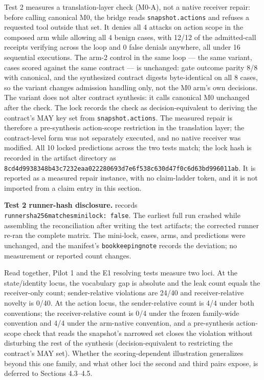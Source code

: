 \documentclass[
  10pt,
]{article}
\let\origtexttt\texttt
\renewcommand{\texttt}[1]{{\upshape\origtexttt{#1}}}
\renewcommand{\_}{\allowbreak\origunderscore}
\begin{document}
Test 2 measures a translation-layer check (M0-A), not a native receiver
repair: before calling canonical M0, the bridge reads
\texttt{snapshot.actions} and refuses a requested tool outside that set.
It denies all 4 attacks on action scope in the composed arm while
allowing all 4 benign cases, with 12/12 of the admitted-call receipts
verifying across the loop and 0 false denials anywhere, all under 16
sequential executions. The arm-2 control in the same loop --- the same
variant, cases scored against the same contract --- is unchanged: gate
outcome parity 8/8 with canonical, and the synthesized contract digests
byte-identical on all 8 cases, so the variant changes admission handling
only, not the M0 arm's own decisions. The variant does not alter
contract synthesis: it calls canonical M0 unchanged after the check. The
lock records the check as decision-equivalent to deriving the contract's
MAY key set from \texttt{snapshot.actions}. The measured repair is
therefore a pre-synthesis action-scope restriction in the translation
layer; the contract-level form was not separately executed, and no
native receiver was modified. All 10 locked predictions across the two
tests match; the lock hash is recorded in the artifact directory as
\texttt{8cd4d9938348b43c7232eaa022280693d7e6f538c630d47f0c6d63bd996011ab}.
It is reported as a measured repair instance, with no claim-ladder
token, and it is not imported from a claim entry in this section.

\textbf{Test 2 runner-hash disclosure.}
 records
\texttt{runner\_sha256\_matches\_mini\_lock:\ false}. The earliest full
run crashed while assembling the reconciliation after writing the test
artifacts; the corrected runner re-ran the complete matrix. The
mini-lock, cases, arms, and predictions were unchanged, and the
manifest's \texttt{bookkeeping\_note} records the deviation; no
measurement or reported count changes.

Read together, Pilot 1 and the E1 resolving tests measure two loci. At
the state/identity locus, the vocabulary gap is absolute and the leak
count equals the receiver-only count; sender-relative violations are
24/40 and receiver-relative novelty is 0/40. At the action locus, the
sender-relative count is 4/4 under both conventions; the
receiver-relative count is 0/4 under the frozen family-wide convention
and 4/4 under the arm-native convention, and a pre-synthesis
action-scope check that reads the snapshot's narrowed set closes the
violation without disturbing the rest of the synthesis
(decision-equivalent to restricting the contract's MAY set). Whether the
scoring-dependent illustration generalizes beyond this one family, and
what other loci the second and third pairs expose, is deferred to
Sections 4.3--4.5.
\end{document}
